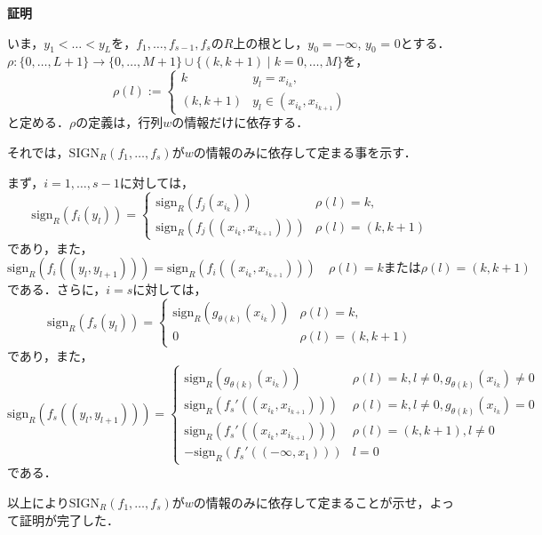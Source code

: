 \documentclass[uplatex, dvipdfmx]{jsarticle}
\makeatletter
\numberwithin{equation}{section}
\renewenvironment{proof}[1][\proofname]{\par
  \pushQED{\qed}%
  \normalfont \topsep6\p@\@plus6\p@\relax
  \trivlist
  \item\relax
  {\bfseries
  #1\@addpunct{.}}\hspace\labelsep\ignorespaces
}{
  \popQED\endtrivlist\@endpefalse
}
\newcommand{\sign}{\mathrm{sign}}
\newcommand{\SIGN}{\mathrm{SIGN}}
\newcommand{\map}[3]{{#1}\colon{#2}\rightarrow{#3}}
\theoremstyle{definition}
\renewcommand{\proofname}{\textbf{証明}}
\makeatother
\begin{document}
\begin{proof}
     いま，$y_1 < \dots < y_L$を，$f_1, \dots, f_{s-1}, f_s$の$R$上の根とし，$y_0 = -\infty$, $y_0$ = 0とする．
     $\map{\rho}{\{0, \dots, L+1\}}{\{0, \dots, M+1\} \cup \{(k,k+1) \mid k=0, \dots, M\}}$を，
     \begin{equation}
          \rho(l) := \begin{cases} 
               k & y_l = x_{i_k},\\
               (k, k+1) & y_l \in (x_{i_k}, x_{i_{k+1}})
          \end{cases}
     \end{equation}
     と定める．$\rho$の定義は，行列$w$の情報だけに依存する．

     それでは，$\SIGN_R(f_1, \dots, f_s)$が$w$の情報のみに依存して定まる事を示す．
     
     まず，$i=1, \dots, s-1$に対しては，
     \begin{equation}
          \sign_R(f_i(y_l)) = \begin{cases}
               \sign_R(f_j(x_{i_k})) & \rho(l) = k,\\
               \sign_R(f_j((x_{i_k}, x_{i_{k+1}}))) & \rho(l) = (k, k+1)
          \end{cases}
     \end{equation}
     であり，また，
     \begin{equation}
          \sign_R(f_i((y_l,y_{l+1}))) = \sign_R(f_i((x_{i_k}, x_{i_{k+1}}))) \quad \text{$\rho(l)=k$または$\rho(l)=(k,k+1)$}
     \end{equation}
     である．さらに，$i=s$に対しては，
     \begin{equation}
          \sign_R(f_s(y_l)) = \begin{cases}
               \sign_R(g_{\theta(k)}(x_{i_k})) & \rho(l) = k,\\
               0 & \rho(l) = (k, k+1)
          \end{cases}
     \end{equation}
     であり，また，
     \begin{equation}
          \sign_R(f_s((y_l,y_{l+1}))) = \begin{cases}
               \sign_R(g_{\theta(k)}(x_{i_k})) & \rho(l) = k, l \neq 0, g_{\theta(k)}(x_{i_k})\neq 0\\
               \sign_R(f_s'((x_{i_k},x_{i_{k+1}}))) & \rho(l)=k, l \neq 0, g_{\theta(k)}(x_{i_k}) = 0 \\
               \sign_R(f_s'((x_{i_k}, x_{i_{k+1}}))) & \rho(l) = (k, k+1), l \neq 0\\
               -\sign_R(f_s'((-\infty, x_1))) & l=0
          \end{cases}
     \end{equation}
     である．

     以上により$\SIGN_R(f_1, \dots, f_s)$が$w$の情報のみに依存して定まることが示せ，よって証明が完了した．
\end{proof}
\end{document}
